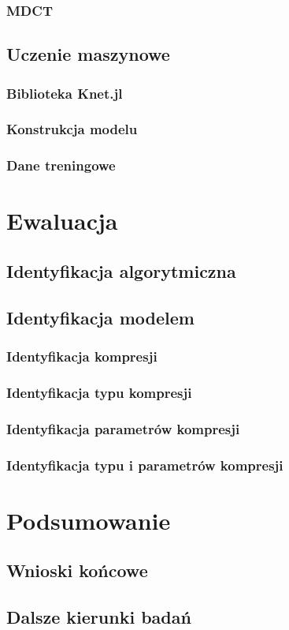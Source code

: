 \documentclass[pl,12pt]{aghdpl}
\let\Oldchapter\chapter%
\renewcommand{\chapter}{\FloatBarrier\Oldchapter}
\let\Oldsection\section%
\renewcommand{\section}{\FloatBarrier\Oldsection}
\let\Oldsubsection\subsection%
\renewcommand{\subsection}{\FloatBarrier\Oldsubsection}
\begin{document}
\subsection{MDCT}
\section{Uczenie maszynowe}
\subsection{Biblioteka Knet.jl}
\subsection{Konstrukcja modelu}
\subsection{Dane treningowe}
\chapter{Ewaluacja}
\section{Identyfikacja algorytmiczna}
\section{Identyfikacja modelem}
\subsection{Identyfikacja kompresji}
\subsection{Identyfikacja typu kompresji}
\subsection{Identyfikacja parametrów kompresji}
\subsection{Identyfikacja typu i parametrów kompresji}
\chapter{Podsumowanie}
\section{Wnioski końcowe}
\section{Dalsze kierunki badań}

\cleardoublepage{}
\printbibliography{}
\end{document}
